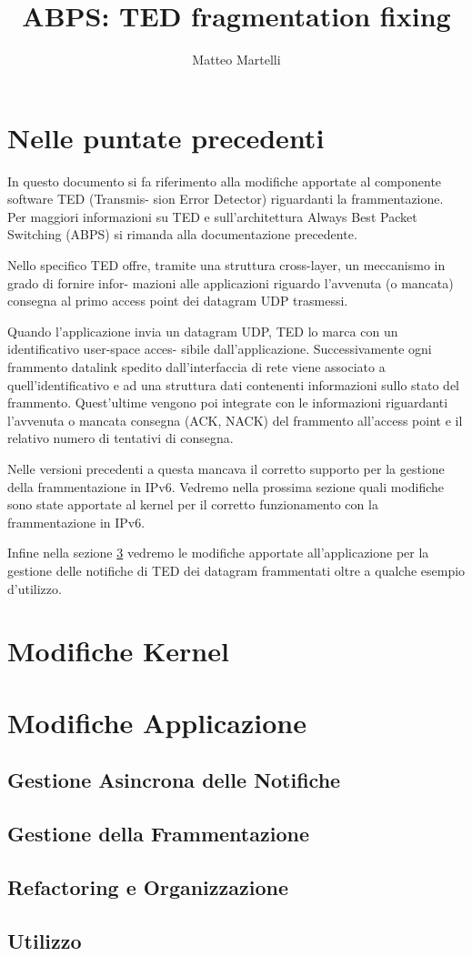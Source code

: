 \documentclass[a4paper,10pt]{article}
\title{ABPS: TED fragmentation fixing}
\author{Matteo Martelli}
\begin{document}
\maketitle


\section{Nelle puntate precedenti}
In questo documento si fa riferimento alla modifiche apportate al componente software TED (Transmis-
sion Error Detector) riguardanti la frammentazione. Per maggiori informazioni su TED e sull’architettura
Always Best Packet Switching (ABPS) si rimanda alla documentazione
precedente. %

Nello specifico TED offre, tramite una struttura cross-layer, un meccanismo in grado di fornire infor-
mazioni alle applicazioni riguardo l’avvenuta (o mancata) consegna al primo access point dei datagram
UDP trasmessi.

Quando l’applicazione invia un datagram UDP, TED lo marca con un identificativo user-space acces-
sibile dall’applicazione. Successivamente ogni frammento datalink spedito dall’interfaccia di rete viene
associato a quell’identificativo e ad una struttura dati contenenti informazioni sullo stato del frammento.
Quest’ultime vengono poi integrate con le informazioni riguardanti l’avvenuta o mancata consegna (ACK,
NACK) del frammento all’access point e il relativo numero di tentativi di consegna.

Nelle versioni precedenti a questa mancava il corretto supporto per la gestione della frammentazione
in IPv6. Vedremo nella prossima sezione quali modifiche sono state apportate al kernel per il corretto
funzionamento con la frammentazione in IPv6.

Infine nella sezione \ref{sec:app} vedremo le modifiche apportate all’applicazione per la gestione delle notifiche
di TED dei datagram frammentati oltre a qualche esempio d’utilizzo.


\section{Modifiche Kernel}



\section{Modifiche Applicazione}
\label{sec:app}
\subsection{Gestione Asincrona delle Notifiche}

\subsection{Gestione della Frammentazione}

\subsection{Refactoring e Organizzazione}

\subsection{Utilizzo}
\end{document}
